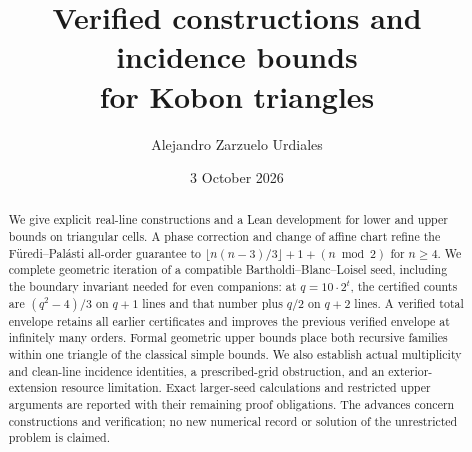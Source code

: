 \documentclass[11pt,a4paper]{article}
\title{Verified constructions and incidence bounds\\for Kobon triangles}
\author{Alejandro Zarzuelo Urdiales}
\date{3 October 2026}
\theoremstyle{definition}
\theoremstyle{remark}
\begin{document}
\maketitle
\begin{abstract}
We give explicit real-line constructions and a Lean development for lower and upper bounds on triangular cells. A phase correction and change of affine chart refine the F\"uredi--Pal\'asti all-order guarantee to $\lfloor n(n-3)/3\rfloor+1+(n\bmod2)$ for $n\ge4$. We complete geometric iteration of a compatible Bartholdi--Blanc--Loisel seed, including the boundary invariant needed for even companions: at $q=10\cdot2^t$, the certified counts are $(q^2-4)/3$ on $q+1$ lines and that number plus $q/2$ on $q+2$ lines. A verified total envelope retains all earlier certificates and improves the previous verified envelope at infinitely many orders. Formal geometric upper bounds place both recursive families within one triangle of the classical simple bounds. We also establish actual multiplicity and clean-line incidence identities, a prescribed-grid obstruction, and an exterior-extension resource limitation. Exact larger-seed calculations and restricted upper arguments are reported with their remaining proof obligations. The advances concern constructions and verification; no new numerical record or solution of the unrestricted problem is claimed.
\end{abstract}







\begingroup
\small
\setlength{\bibsep}{3pt}


\endgroup
\end{document}
